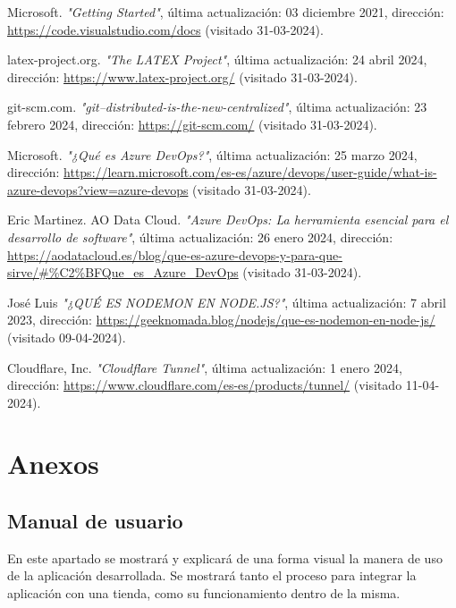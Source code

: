 \documentclass[12pt]{article}
\begin{document}
\begin{thebibliography}{100}
    Microsoft.
    \textit{"Getting Started"}, última actualización: 03 diciembre 2021, dirección: \url{https://code.visualstudio.com/docs} (visitado 31-03-2024).

    latex-project.org.
    \textit{"The LATEX Project"}, última actualización: 24 abril 2024, dirección: \url{https://www.latex-project.org/} (visitado 31-03-2024).

    git-scm.com.
    \textit{"git--distributed-is-the-new-centralized"}, última actualización: 23 febrero 2024, dirección: \url{https://git-scm.com/} (visitado 31-03-2024).

    Microsoft.
    \textit{"¿Qué es Azure DevOps?"}, última actualización: 25 marzo 2024, dirección: \url{https://learn.microsoft.com/es-es/azure/devops/user-guide/what-is-azure-devops?view=azure-devops} (visitado 31-03-2024).

    Eric Martinez. AO Data Cloud.
    \textit{"Azure DevOps: La herramienta esencial para el desarrollo de software"}, última actualización: 26 enero 2024, dirección: \url{https://aodatacloud.es/blog/que-es-azure-devops-y-para-que-sirve/#%C2%BFQue_es_Azure_DevOps} (visitado 31-03-2024).

    José Luis
    \textit{"¿QUÉ ES NODEMON EN NODE.JS?"}, última actualización: 7 abril 2023, dirección: \url{https://geeknomada.blog/nodejs/que-es-nodemon-en-node-js/} (visitado 09-04-2024).

    Cloudflare, Inc.
    \textit{"Cloudflare Tunnel"}, última actualización: 1 enero 2024, dirección: \url{https://www.cloudflare.com/es-es/products/tunnel/} (visitado 11-04-2024).

\end{thebibliography}

\newpage
\section{Anexos}

\subsection{Manual de usuario}
En este apartado se mostrará y explicará de una forma visual la manera de uso de la aplicación desarrollada. Se mostrará tanto el proceso para integrar la aplicación con una tienda, como
su funcionamiento dentro de la misma.
\end{document}
